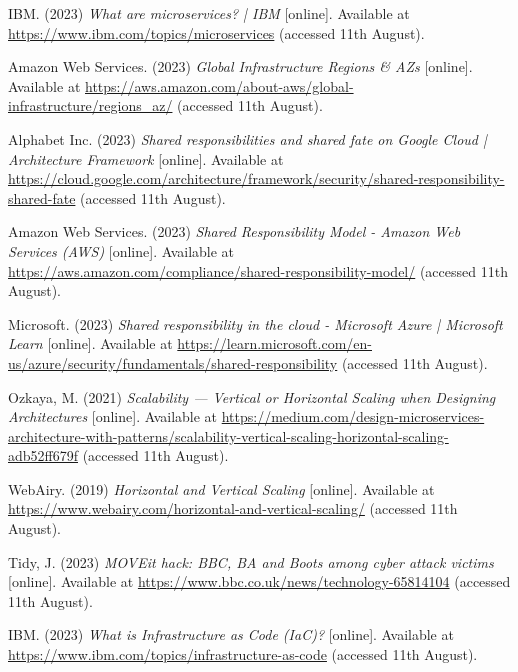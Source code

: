  \noindent [7] IBM. (2023) \textit{What are microservices? | IBM} [online]. Available at \url{https://www.ibm.com/topics/microservices} (accessed 11th August).
 \vspace{0.2cm}

 \noindent [8] Amazon Web Services. (2023) \textit{Global Infrastructure Regions \& AZs} [online]. Available at \url{https://aws.amazon.com/about-aws/global-infrastructure/regions_az/} (accessed 11th August).
 \vspace{0.2cm}

 \noindent [9] Alphabet Inc. (2023) \textit{Shared responsibilities and shared fate on Google Cloud | Architecture Framework} [online]. Available at \url{https://cloud.google.com/architecture/framework/security/shared-responsibility-shared-fate} (accessed 11th August).
 \vspace{0.2cm}

 \noindent [10] Amazon Web Services. (2023) \textit{Shared Responsibility Model - Amazon Web Services (AWS)} [online]. Available at \url{https://aws.amazon.com/compliance/shared-responsibility-model/} (accessed 11th August).
 \vspace{0.2cm}

 \noindent [11] Microsoft. (2023) \textit{Shared responsibility in the cloud - Microsoft Azure | Microsoft Learn} [online]. Available at \url{https://learn.microsoft.com/en-us/azure/security/fundamentals/shared-responsibility} (accessed 11th August).
 \vspace{0.2cm}

 \noindent [12] Ozkaya, M. (2021) \textit{Scalability — Vertical or Horizontal Scaling when Designing Architectures} [online]. Available at \url{https://medium.com/design-microservices-architecture-with-patterns/scalability-vertical-scaling-horizontal-scaling-adb52ff679f} (accessed 11th August).
 \vspace{0.2cm}

 \noindent [13] WebAiry. (2019) \textit{Horizontal and Vertical Scaling} [online]. Available at \url{https://www.webairy.com/horizontal-and-vertical-scaling/} (accessed 11th August).
 \vspace{0.2cm}

 \noindent [14] Tidy, J. (2023) \textit{MOVEit hack: BBC, BA and Boots among cyber attack victims} [online]. Available at \url{https://www.bbc.co.uk/news/technology-65814104} (accessed 11th August).
 \vspace{0.2cm}

 \noindent [15] IBM. (2023) \textit{What is Infrastructure as Code (IaC)?} [online]. Available at \url{https://www.ibm.com/topics/infrastructure-as-code} (accessed 11th August).
 \vspace{0.2cm}

